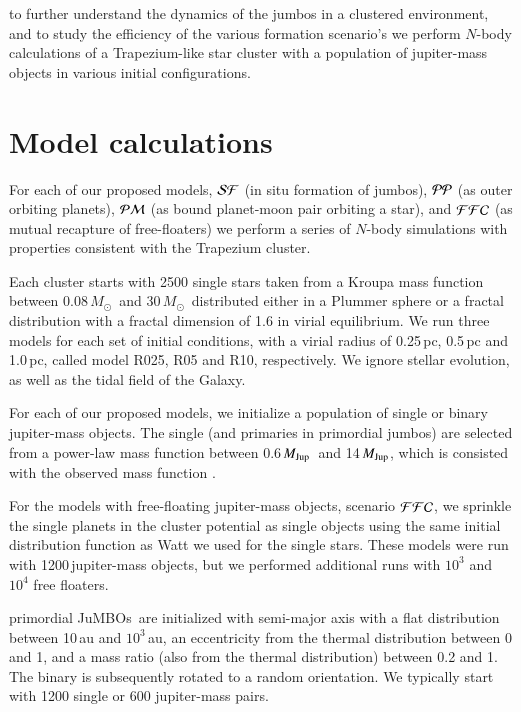 \documentclass[aa]{aa}
\newcommand{\MSun}{\mbox{${M}_\odot$}}
\newcommand{\MJup}{\mbox{${M}_{\rm Jup}$}}
\newcommand{\jumbos}{\mbox{JuMBOs}}
\begin{document}
to further understand the dynamics of the jumbos in a clustered
environment, and to study the efficiency of the various formation
scenario's we perform $N$-body calculations of a Trapezium-like star
cluster with a population of jupiter-mass objects in various initial
configurations.

\section{Model calculations}

For each of our proposed models, ${\cal SF}$ (in situ formation of
jumbos), ${\cal PP}$ (as outer orbiting planets), ${\cal PM}$ (as bound
planet-moon pair orbiting a star), and ${\cal FFC}$ (as mutual
recapture of free-floaters) we perform a series of $N$-body
simulations with properties consistent with the Trapezium cluster.

Each cluster starts with 2500 single stars taken from a Kroupa mass
function \cite{2002MNRAS.336.1188K} between 0.08\,\MSun\, and
$30$\,\MSun\, distributed either in a Plummer sphere or a fractal
distribution with a fractal dimension of 1.6 in virial equilibrium.  We
run three models for each set of initial conditions, with a virial
radius of 0.25\,pc, 0.5\,pc and 1.0\,pc, called model R025, R05 and
R10, respectively.  We ignore stellar evolution, as well as the
tidal field of the Galaxy.

For each of our proposed models, we initialize a population of single
or binary jupiter-mass objects. The single (and primaries in
primordial jumbos) are selected from a power-law mass function between
0.6\,\MJup\, and 14\,\MJup, which is consisted with the observed mass
function \cite{2023arXiv231001231P}.

For the models with free-floating jupiter-mass objects, scenario
${\cal FFC}$, we sprinkle the single planets in the cluster potential
as single objects using the same initial distribution function as Watt
we used for the single stars.  These models were run with
1200\,jupiter-mass objects, but we performed additional runs with
$10^3$ and $10^4$ free floaters.

primordial \jumbos\, are initialized with semi-major axis with a flat
distribution between 10\,au and $10^3$\,au, an eccentricity from the
thermal distribution between 0 and 1, and a mass ratio (also from the
thermal distribution) between 0.2 and 1.  The binary is subsequently
rotated to a random orientation. We typically start with 1200 single
or 600 jupiter-mass pairs.
\end{document}
